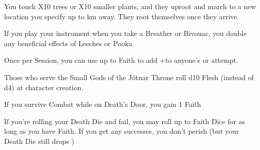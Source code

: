 {You touch \DICE X10 trees or \SUMDICE X10 smaller plants, and they uproot and march to a new location you specify up to \DICE km away. They root themselves once they arrive.


\GOD[
Name=Yan Oshoth,
Link=small-god-yan oshoth,
GodOf=Lady of Songs and Poetry (Ancestors),
Holy=a small musical instrument
]


If you play your instrument when you take a Breather or Bivouac, you double any beneficial effects of Leeches or Pooka


Once per Session, you can use up to \LVL Faith to add +\SUMDICE to anyone's \RO or \RB attempt.

\newpage






Those who serve the Small Gods of the Jötnar Throne roll d10 Flesh (instead of d4) at character creation.





\GOD[
Name=Crom,
Link=small-god-crom,
GodOf=Arbiter of Honorable Death,
Holy=The Devotee must name one of their weapons; this weapon will be used as their holy symbol
]


If you survive Combat while on Death's Door, you gain 1 Faith


If you're rolling your Death Die and fail, you may roll up to \LVL Faith Dice for as long as you have Faith.  If you get any successes, you don't perish (but your Death Die still drops \DCDOWN)




\GOD[
Name=Cú Chulainn,
Link=small-god-cú chulainn,
GodOf=God of the Battle Frenzy,
Holy=A headdress of raven or crow feathers
]

}
